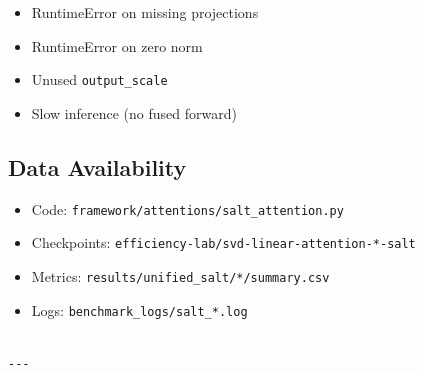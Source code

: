 \begin{itemize}
\item RuntimeError on missing projections
\item RuntimeError on zero norm
\item Unused \texttt{output\_scale}
\item Slow inference (no fused forward)

\end{itemize}
\subsection{Data Availability}

\begin{itemize}
\item Code: \texttt{framework/attentions/salt\_attention.py}
\item Checkpoints: \texttt{efficiency-lab/svd-linear-attention-*-salt}
\item Metrics: \texttt{results/unified\_salt/*/summary.csv}
\item Logs: \texttt{benchmark\_logs/salt\_*.log}
\end{itemize}
\begin{lstlisting}

---
\end{lstlisting}